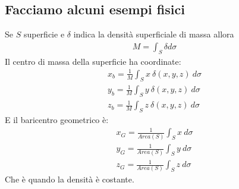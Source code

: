 \documentclass[a4paper, oneside]{article}
\begin{document}
\subsection{Facciamo alcuni esempi fisici}
\begin{example}
  Se $S$ superficie e $\delta$ indica la densità superficiale di massa allora
  \begin{gather*}
    M = \int_S \delta d \sigma
  \end{gather*}
  Il centro di massa della superficie ha coordinate:
  \begin{gather*}
    x_b = \frac{1}{M} \int_S x \ \delta(x,y,z) \ d \sigma\\
    y_b = \frac{1}{M} \int_S y \ \delta(x,y,z) \ d \sigma\\
    z_b = \frac{1}{M} \int_S z \ \delta(x,y,z) \ d \sigma
  \end{gather*}
  E il baricentro geometrico è:
  \begin{gather*}
    x_G = \frac{1}{Area(S)} \int_S x \ d \sigma\\
    y_G = \frac{1}{Area(S)} \int_S y \ d \sigma\\
    z_G = \frac{1}{Area(S)} \int_S z \ d \sigma
  \end{gather*}
  Che è quando la densità è costante.
\end{example}
\end{document}
